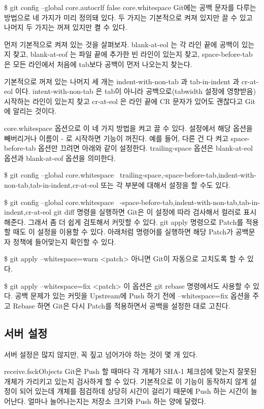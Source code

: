 \documentclass[12pt, a4paper, oneside]{book}
\begin{document}
\$ git config --global core.autocrlf false
core.whitespace
Git에는 공백 문자를 다루는 방법으로 네 가지가 미리 정의돼 있다. 두 가지는 기본적으로 켜져 있지만 끌 수 있고 나머지 두 가지는 꺼져 있지만 켤 수 있다.

먼저 기본적으로 켜져 있는 것을 살펴보자. blank-at-eol 는 각 라인 끝에 공백이 있는지 찾고, blank-at-eof 는 파일 끝에 추가한 빈 라인이 있는지 찾고, space-before-tab 은 모든 라인에서 처음에 tab보다 공백이 먼저 나오는지 찾는다.

기본적으로 꺼져 있는 나머지 세 개는 indent-with-non-tab 과 tab-in-indent 과 cr-at-eol 이다. intent-with-non-tab 은 tab이 아니라 공백으로(tabwidth 설정에 영향받음) 시작하는 라인이 있는지 찾고 cr-at-eol 은 라인 끝에 CR 문자가 있어도 괜찮다고 Git에 알리는 것이다.

core.whitespace 옵션으로 이 네 가지 방법을 켜고 끌 수 있다. 설정에서 해당 옵션을 빼버리거나 이름이 - 로 시작하면 기능이 꺼진다. 예를 들어, 다른 건 다 켜고 space-before-tab 옵션만 끄려면 아래와 같이 설정한다. trailing-space 옵션은 blank-at-eol 옵션과 blank-at-eof 옵션을 의미한다.

\$ git config --global core.whitespace \
    trailing-space,-space-before-tab,indent-with-non-tab,tab-in-indent,cr-at-eol
또는 각 부분에 대해서 설정을 할 수도 있다.

\$ git config --global core.whitespace \
    -space-before-tab,indent-with-non-tab,tab-in-indent,cr-at-eol
git diff 명령을 실행하면 Git은 이 설정에 따라 검사해서 컬러로 표시해준다. 그래서 좀 더 쉽게 검토해서 커밋할 수 있다. git apply 명령으로 Patch를 적용할 때도 이 설정을 이용할 수 있다. 아래처럼 명령어를 실행하면 해당 Patch가 공백문자 정책에 들어맞는지 확인할 수 있다.

\$ git apply --whitespace=warn <patch>
아니면 Git이 자동으로 고치도록 할 수 있다.

\$ git apply --whitespace=fix <patch>
이 옵션은 git rebase 명령에서도 사용할 수 있다. 공백 문제가 있는 커밋을 Upstream에 Push 하기 전에 --whitespace=fix 옵션을 주고 Rebase 하면 Git은 다시 Patch를 적용하면서 공백을 설정한 대로 고친다.



\subsection{서버 설정}
서버 설정은 많지 않지만, 꼭 짚고 넘어가야 하는 것이 몇 개 있다.

receive.fsckObjects
Git은 Push 할 때마다 각 개체가 SHA-1 체크섬에 맞는지 잘못된 개체가 가리키고 있는지 검사하게 할 수 있다. 기본적으로 이 기능이 동작하지 않게 설정이 되어 있는데 개체를 점검하데 상당히 시간이 걸리기 때문에 Push 하는 시간이 늘어난다. 얼마나 늘어나는지는 저장소 크기와 Push 하는 양에 달렸다. 
\end{document}
